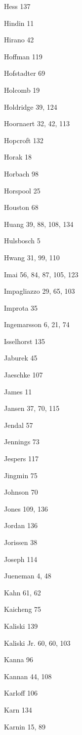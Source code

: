 \begin{theindex}
\item Hess 137
\item Hindin 11
\item Hirano 42
\item Hoffman 119
\item Hofstadter 69
\item Holcomb 19
\item Holdridge 39, 124
\item Hoornaert 32, 42, 113
\item Hopcroft 132
\item Horak 18
\item Horbach 98
\item Horspool 25
\item Houston 68
\item Huang 39, 88, 108, 134
\item Hulsbosch 5
\item Hwang 31, 99, 110
\item Imai 56, 84, 87, 105, 123
\item Impagliazzo 29, 65, 103
\item Improta 35
\item Ingemarsson 6, 21, 74
\item Isselhorst 135
\item Jaburek 45
\item Jaeschke 107
\item James 11
\item Jansen 37, 70, 115
\item Jendal 57
\item Jennings 73
\item Jespers 117
\item Jingmin 75
\item Johnson 70
\item Jones 109, 136
\item Jordan 136
\item Jorissen 38
\item Joseph 114
\item Jueneman 4, 48
\item Kahn 61, 62
\item Kaicheng 75
\item Kaliski 139
\item {Kaliski Jr.} 60, 60, 103
\item Kanna 96
\item Kannan 44, 108
\item Karloff 106
\item Karn 134
\item Karnin 15, 89

\end{theindex}
